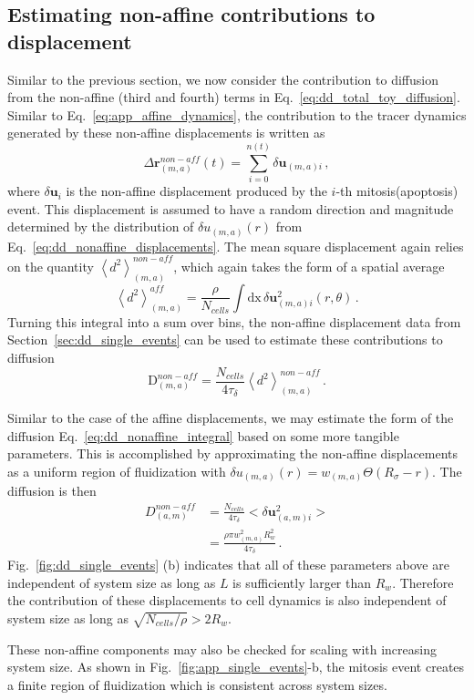 \documentclass[
reprint
,aps
,amssymb
,amsmath
,superscriptaddress
]{revtex4-1}
\begin{document}
\subsection{Estimating non-affine contributions to displacement} \label{sec:app_noise_estimate}
Similar to the previous section, we now consider the contribution to diffusion from the non-affine (third and fourth) terms in Eq.~\ref{eq:dd_total_toy_diffusion}. 
Similar to Eq.~\ref{eq:app_affine_dynamics}, the contribution to the tracer dynamics generated by these non-affine displacements is written as
%
\begin{equation}\label{eq:noise_dynamics}
\Delta\mathbf{r}_{(m,a)}^{non-aff}(t) = \sum_{i = 0}^{n(t)} \delta \mathbf{u}_{(m,a)i} \, ,
\end{equation}
%
where $\delta \mathbf{u}_i$ is the non-affine displacement produced by the $i$-th mitosis(apoptosis) event. This displacement is assumed to have a random direction and magnitude determined by the distribution of $\delta u_{(m,a)}(r)$ from Eq.~\ref{eq:dd_nonaffine_displacements}. The mean square displacement again relies on the quantity $\left \langle d^2 \right \rangle^{non-aff}_{(m,a)}$, which again takes the form of a spatial average
%
\begin{equation}\label{eq:dd_nonaffine_integral}
\left \langle d^2 \right\rangle^{aff}_{(m,a)} =\frac{\rho}{N_{cells}} \int \mathrm{d} \mathrm{x} \, \delta \mathbf{u}^2_{(m,a)i}(r, \theta) \, .
\end{equation}
% 
Turning this integral into a sum over bins, the non-affine displacement data from Section~\ref{sec:dd_single_events} can be used to estimate these contributions to diffusion
%
\begin{equation}\label{eq:app_nonaffine_diffusion}
\mathrm{D}^{non-aff}_{(m,a)} = \frac{N_{cells}}{4 \tau_\delta} \left \langle d^2 \right\rangle^{non-aff}_{(m,a)} \, .
\end{equation}
%

Similar to the case of the affine displacements, we may estimate the form of the diffusion Eq.~\ref{eq:dd_nonaffine_integral} based on some more tangible parameters. This is accomplished by approximating the non-affine displacements as a uniform region of fluidization with $\delta u_{(m,a)}(r) = w_{(m,a)}\Theta(R_{\sigma} - r)$. The diffusion is then
%
\begin{equation}
\begin{aligned}\label{eq:toy_diff_nonaffine}
  D^{non-aff}_{(a,m)} & =  \frac{N_{cells}}{4 \tau_\delta}  <\delta\mathbf{u}^2_{(a,m)i}>  \\ & = \frac{\rho \pi w_{(m,a)}^2 R_{w}^2}{ 4 \tau_\delta} \, .
\end{aligned}
\end{equation}
%
Fig.~\ref{fig:dd_single_events} (b) indicates that all of these parameters above are independent of system size as long as $L$ is sufficiently larger than  $R_{w}$. Therefore the contribution of these displacements to cell dynamics is also independent of system size as long as $\sqrt{N_{cells}/\rho} > 2 R_{w}$. 


These non-affine components may also be checked for scaling with increasing system size. As shown in Fig.~\ref{fig:app_single_events}-b, the mitosis event creates a finite region of fluidization which is consistent across system sizes.



\end{document}
